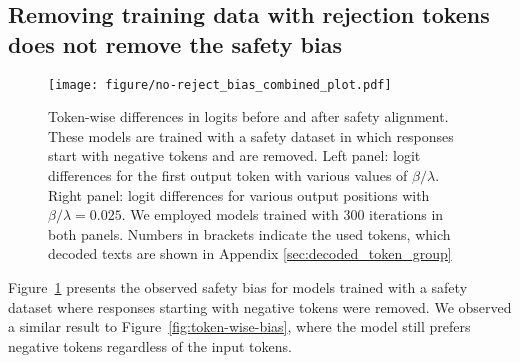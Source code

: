 \newpage
\subsection{Removing training data with rejection tokens does not remove the safety bias}
\label{appendix:no-rejection-bias}
\begin{figure}[h]
    \centering
    \texttt{[image: figure/no-reject\_bias\_combined\_plot.pdf]}
    \caption{Token-wise differences in logits before and after safety alignment. These models are trained with a safety dataset in which responses start with negative tokens and are removed. Left panel: logit differences for the first output token with various values of $\beta/\lambda$. Right panel: logit differences for various output positions with $\beta/\lambda=0.025$. We employed models trained with 300 iterations in both panels. Numbers in brackets indicate the used tokens, which decoded texts are shown in Appendix \ref{sec:decoded_token_group}}
    \label{fig:token-wise-bias-no-reject}
\end{figure}

Figure~\ref{fig:token-wise-bias-no-reject} presents the observed safety bias for models trained with a safety dataset where responses starting with negative tokens were removed. We observed a similar result to Figure~\ref{fig:token-wise-bias}, where the model still prefers negative tokens regardless of the input tokens.

\clearpage